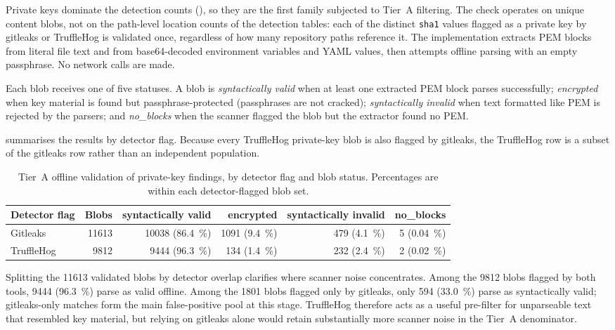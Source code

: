 Private keys dominate the detection counts (), so they are the first family subjected to Tier~A filtering.
The check operates on unique content blobs, not on the path-level location counts of the detection tables: each of the distinct \texttt{sha1} values flagged as a private key by gitleaks or TruffleHog is validated once, regardless of how many repository paths reference it.
The implementation extracts PEM blocks from literal file text and from base64-decoded environment variables and YAML values, then attempts offline parsing with an empty passphrase.
No network calls are made.

Each blob receives one of five statuses.
A blob is \emph{syntactically valid} when at least one extracted PEM block parses successfully; \emph{encrypted} when key material is found but passphrase-protected (passphrases are not cracked); \emph{syntactically invalid} when text formatted like PEM is rejected by the parsers; and \emph{no\_blocks} when the scanner flagged the blob but the extractor found no PEM.

 summarises the results by detector flag.
Because every TruffleHog private-key blob is also flagged by gitleaks, the TruffleHog row is a subset of the gitleaks row rather than an independent population.

\begin{table}[h]
\centering
\caption{Tier~A offline validation of private-key findings, by detector flag and blob status. Percentages are within each detector-flagged blob set.}
\label{tab:sec-pk-tier-a}
\small
\begin{tabular}{lrrrrr}
\hline
\textbf{Detector flag} & \textbf{Blobs} & \textbf{syntactically valid} & \textbf{encrypted} & \textbf{syntactically invalid} & \textbf{no\_blocks} \\
\hline
Gitleaks & \num{11613} & \num{10038} (\SI{86.4}{\percent}) & \num{1091} (\SI{9.4}{\percent}) & \num{479} (\SI{4.1}{\percent}) & \num{5} (\SI{0.04}{\percent}) \\
TruffleHog & \num{9812} & \num{9444} (\SI{96.3}{\percent}) & \num{134} (\SI{1.4}{\percent}) & \num{232} (\SI{2.4}{\percent}) & \num{2} (\SI{0.02}{\percent}) \\
\hline
\end{tabular}
\end{table}

Splitting the \num{11613} validated blobs by detector overlap clarifies where scanner noise concentrates.
Among the \num{9812} blobs flagged by both tools, \num{9444} (\SI{96.3}{\percent}) parse as valid offline.
Among the \num{1801} blobs flagged only by gitleaks, only \num{594} (\SI{33.0}{\percent}) parse as syntactically valid; gitleaks-only matches form the main false-positive pool at this stage.
TruffleHog therefore acts as a useful pre-filter for unparseable text that resembled key material, but relying on gitleaks alone would retain substantially more scanner noise in the Tier~A denominator.

